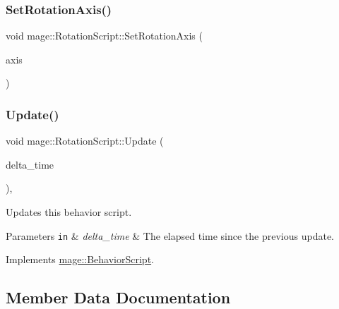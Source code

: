 \hypertarget{classmage_1_1_rotation_script_a32c12db9206002a1aa2dd0e2e3b4ecd7}{}\label{classmage_1_1_rotation_script_a32c12db9206002a1aa2dd0e2e3b4ecd7} 
\subsubsection{\texorpdfstring{Set\+Rotation\+Axis()}{SetRotationAxis()}}
{\footnotesize\ttfamily void mage\+::\+Rotation\+Script\+::\+Set\+Rotation\+Axis (\begin{DoxyParamCaption}\item[{\hyperlink{classmage_1_1_rotation_script_ad06cf896ce6dfe4f6676b263d15b4ee9}{Rotation\+Axis}}]{axis }\end{DoxyParamCaption})\hspace{0.3cm}{\ttfamily [noexcept]}}

\hypertarget{classmage_1_1_rotation_script_a96936107b1b955cce5e84b8081f930bb}{}\label{classmage_1_1_rotation_script_a96936107b1b955cce5e84b8081f930bb} 
\subsubsection{\texorpdfstring{Update()}{Update()}}
{\footnotesize\ttfamily void mage\+::\+Rotation\+Script\+::\+Update (\begin{DoxyParamCaption}\item[{double}]{delta\+\_\+time }\end{DoxyParamCaption})\hspace{0.3cm}{\ttfamily [override]}, {\ttfamily [virtual]}}

Updates this behavior script.


\begin{DoxyParams}[1]{Parameters}
\mbox{\tt in}  & {\em delta\+\_\+time} & The elapsed time since the previous update. \\
\hline
\end{DoxyParams}


Implements \hyperlink{classmage_1_1_behavior_script_a905b6c83640cb91d19fecab3435f6feb}{mage\+::\+Behavior\+Script}.



\subsection{Member Data Documentation}
\hypertarget{classmage_1_1_rotation_script_a8fb1d0fb6e3dac1dd91f2d16e1954f21}{}\label{classmage_1_1_rotation_script_a8fb1d0fb6e3dac1dd91f2d16e1954f21} 
